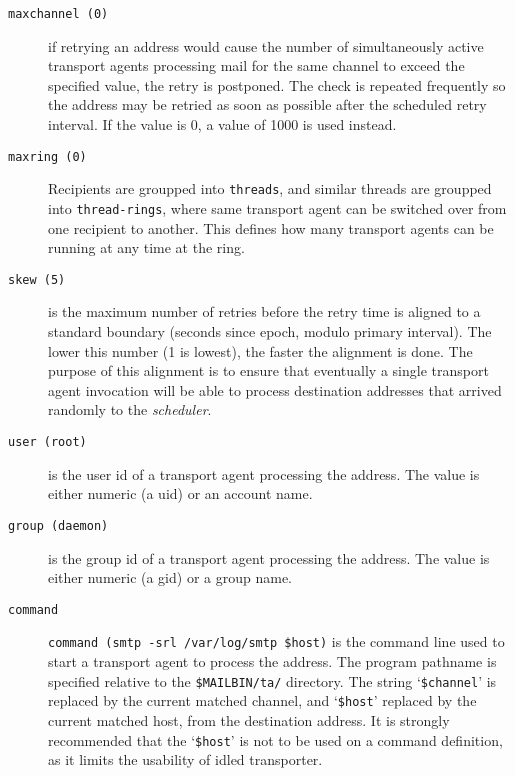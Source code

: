 \begin{description}
\item[{\tt maxchannel (0)}] \mbox{}

if retrying an address would cause the number of simultaneously active
transport agents processing mail for the same channel to exceed
the specified value, the retry is postponed.
The check is repeated frequently so the address may be retried as soon
as possible after the scheduled retry interval. If the value is 0,
a value of 1000 is used instead.



\item[{\tt maxring (0)}] \mbox{}

Recipients are groupped into {\tt threads}, 
and similar threads are groupped into {\tt thread-rings}, where same 
transport agent can be switched over from one recipient to another. This 
defines how many transport agents can be running at any time at the ring.



\item[{\tt skew (5)}] \mbox{}

is the maximum number of retries before the retry 
time is aligned to a standard boundary (seconds since epoch, modulo primary 
interval). The lower this number (1 is lowest), the faster the alignment is 
done. The purpose of this alignment is to ensure that eventually a single 
transport agent invocation will be able to process destination addresses 
that arrived randomly to the {\em scheduler\/}.



\item[{\tt user (root)}] \mbox{}

is the user id of a transport agent processing 
the address. The value is either numeric (a uid) or an account name.



\item[{\tt group (daemon)}] \mbox{}

is the group id of a transport agent processing 
the address. The value is either numeric (a gid) or a group name.



\item[{\tt command}] \mbox{}

{\tt command (smtp -srl /var/log/smtp \$host)} 
is the command line used to start a transport agent to process the address.
The program pathname is specified relative to the {\tt \$MAILBIN/ta/}
directory. The string `{\tt \$channel}' is replaced by the current
matched channel, and `{\tt \$host}' replaced by the current matched 
host, from the destination address. It is strongly recommended that the 
`{\tt \$host}' is not to be used on a command definition, as it limits 
the usability of idled transporter.




\end{description}
